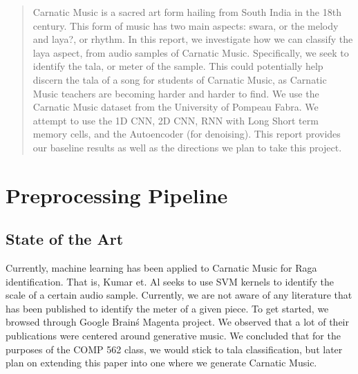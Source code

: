 \documentclass{article}
\begin{document}
 


\begin{abstract} 
	Carnatic Music is a sacred art form hailing from South India in the 18th century. This form of music has two main aspects: swara, or the melody and laya?, or rhythm. In this report, we investigate how we can classify the laya aspect, from audio samples of Carnatic Music. Specifically, we seek to identify the tala, or meter of the sample. This could potentially help discern the tala of a song for students of Carnatic Music, as Carnatic Music teachers are becoming harder and harder to find. We use the Carnatic Music dataset from the University of Pompeau Fabra. We attempt to use the 1D CNN, 2D CNN, RNN with Long Short term memory cells, and the Autoencoder (for denoising). This report provides our baseline results as well as the directions we plan to take this project.
\end{abstract} 
\section{Preprocessing Pipeline}

\subsection{State of the Art}
Currently, machine learning has been applied to Carnatic Music for Raga identification. That is, Kumar et. Al seeks to use SVM kernels to identify the scale of a certain audio sample. Currently, we are not aware of any literature that has been published to identify the meter of a given piece. To get started, we browsed through Google Brain\'s Magenta project. We observed that a lot of their publications were centered around generative music. We concluded that for the purposes of the COMP 562 class, we would stick to tala classification, but later plan on extending this paper into one where we generate Carnatic Music.
\end{document}
